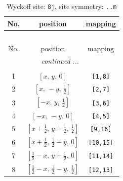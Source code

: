 \documentclass[fleqn,8pt]{jsarticle}
\begin{document}
\begin{longtable}{ccc}
\caption{Wyckoff site: {\tt 8j}, site symmetry: {\tt ..m}}
 \\
 \hline \hline
No. & position & mapping \\ \hline \endfirsthead

\multicolumn{2}{l}{\tablename\ \thetable{}} \\
 \hline \hline
No. & position & mapping \\ \hline \endhead

 \hline \hline
\multicolumn{2}{r}{\footnotesize\it continued ...} \\ \endfoot

 \hline \hline
\multicolumn{2}{r}{} \\ \endlastfoot

1 & $\left[ x,\, y,\, 0 \right]$ & {\tt [1,8]} \\ \hline
2 & $\left[ x,\, - y,\, \frac{1}{2} \right]$ & {\tt [2,7]} \\ \hline
3 & $\left[ - x,\, y,\, \frac{1}{2} \right]$ & {\tt [3,6]} \\ \hline
4 & $\left[ - x,\, - y,\, 0 \right]$ & {\tt [4,5]} \\ \hline
5 & $\left[ x + \frac{1}{2},\, y + \frac{1}{2},\, \frac{1}{2} \right]$ & {\tt [9,16]} \\ \hline
6 & $\left[ x + \frac{1}{2},\, \frac{1}{2} - y,\, 0 \right]$ & {\tt [10,15]} \\ \hline
7 & $\left[ \frac{1}{2} - x,\, y + \frac{1}{2},\, 0 \right]$ & {\tt [11,14]} \\ \hline
8 & $\left[ \frac{1}{2} - x,\, \frac{1}{2} - y,\, \frac{1}{2} \right]$ & {\tt [12,13]} \\
\end{longtable}
\renewcommand{\arraystretch}{1.2}
\end{document}
